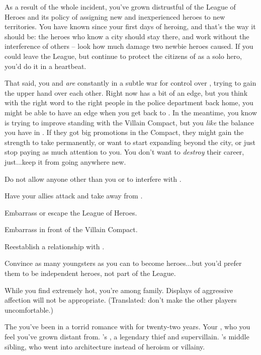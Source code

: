 \documentclass[char]{LRSguildcamp1}
\begin{document}
As a result of the whole incident, you've grown distrustful of the League of Heroes and its policy of assigning new and inexperienced heroes to new territories.  You have known \pCityO{} since your first days of heroing, and that's the way it should be: the heroes who know a city should stay there, and work without the interference of others -- look how much damage two newbie heroes caused.  If you could leave the League, but continue to protect the citizens of \pCityO{} as a solo hero, you'd do it in a heartbeat.

That said, you and \cOldest{} \emph{are} constantly in a subtle war for control over \pCityO{}, trying to gain the upper hand over each other.  Right now \cOldest{} has a bit of an edge, but you think with the right word to the right people in the police department back home, you might be able to have an edge when you get back to \pCityO{}.  In the meantime, you know \cOldest{} is trying to improve \cOldest{\their} standing with the Villain Compact, but you {\em like} the balance you have in \pCityO{}.  If they got big promotions in the Compact, they might gain the strength to take \pCityO{} permanently, or want to start expanding beyond the city, or just stop paying as much attention to you.  You don't want to {\em destroy} their career, just...keep it from going anywhere new.

\begin{itemz}[Goals]
	\item Do not allow anyone other than you or \cOS{} to interfere with \pCityO{}.  %
	\item Have your allies attack and take \pCityO{} away from \cOldest{}.
	\item Embarrass or escape the League of Heroes.
	\item Embarrass \cOldest{} in front of the Villain Compact.
	\item Reestablish a relationship with \cGrad{}.
	\item Convince as many youngsters as you can to become heroes...but you'd prefer them to be independent heroes, not part of the League.
\end{itemz}

\begin{itemz}[Notes]
	\item While you find \cOS{} extremely hot, you're among family.  Displays of aggressive affection will not be appropriate.  (Translated: don't make the other players uncomfortable.)
\end{itemz}

\begin{contacts}
	\contact{\cOldest{}}  The \cOldest{\villain} you've been in a torrid romance with for twenty-two years.
	\contact{\cGrad{}} Your \cGrad{\offspring}, who you feel you've grown distant from.
	\contact{\cGrandma{}} \cOldest{}'s \cGrandma{\parent}, a legendary thief and supervillain.
	\contact{\cArchitect{}} \cOldest{}'s middle sibling, who went into architecture instead of heroism or villainy.  
\end{contacts}
\end{document}
